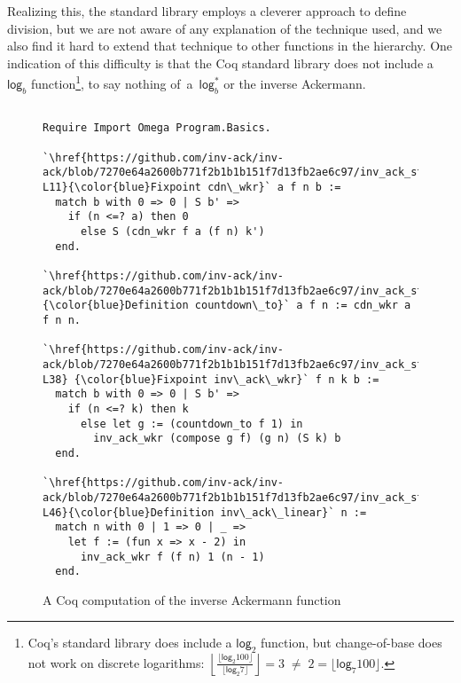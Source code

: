 Realizing this, the standard library employs
a cleverer approach to define division, but we are not aware of any explanation
of the technique used, and we also find it hard to extend that technique
to other functions in the hierarchy.  One indication
of this difficulty is that the Coq standard library does not include a $\mathsf{log}_b$ function\footnote{Coq's standard library does include a $\mathsf{log}_2$ function, but
change-of-base does not work on discrete logarithms:
$\left \lfloor \frac{\lfloor \mathsf{log}_2 100 \rfloor}{\lfloor \mathsf{log}_2 7 \rfloor} \right \rfloor = 3 \; \not= \; 2 = \lfloor \mathsf{log}_7 100 \rfloor$.
}, to say nothing of~a~$\mathsf{log}^{*}_b$ or the inverse Ackermann.

\begin{figure}
\lstset{style=myTinyStyle}
\begin{lstlisting}

Require Import Omega Program.Basics.

`\href{https://github.com/inv-ack/inv-ack/blob/7270e64a2600b771f2b1b1b151f7d13fb2ae6c97/inv_ack_standalone.v#L6-L11}{\color{blue}Fixpoint cdn\_wkr}` a f n b :=
  match b with 0 => 0 | S b' =>
    if (n <=? a) then 0
      else S (cdn_wkr f a (f n) k')
  end.

`\href{https://github.com/inv-ack/inv-ack/blob/7270e64a2600b771f2b1b1b151f7d13fb2ae6c97/inv_ack_standalone.v#L14}{\color{blue}Definition countdown\_to}` a f n := cdn_wkr a f n n.

`\href{https://github.com/inv-ack/inv-ack/blob/7270e64a2600b771f2b1b1b151f7d13fb2ae6c97/inv_ack_standalone.v#L32-L38} {\color{blue}Fixpoint inv\_ack\_wkr}` f n k b :=
  match b with 0 => 0 | S b' =>
    if (n <=? k) then k
      else let g := (countdown_to f 1) in
        inv_ack_wkr (compose g f) (g n) (S k) b
  end.

`\href{https://github.com/inv-ack/inv-ack/blob/7270e64a2600b771f2b1b1b151f7d13fb2ae6c97/inv_ack_standalone.v#L42-L46}{\color{blue}Definition inv\_ack\_linear}` n :=
  match n with 0 | 1 => 0 | _ => 
    let f := (fun x => x - 2) in
      inv_ack_wkr f (f n) 1 (n - 1)
  end.
\end{lstlisting}
\caption{A Coq computation of the inverse Ackermann function}
\label{fig:standalone}
\end{figure}


